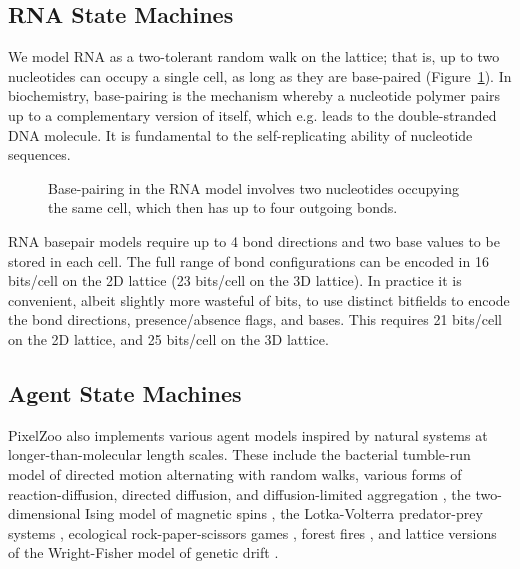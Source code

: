 \documentclass{acm_proc_article-sp}
\begin{document}
\subsection{RNA State Machines}

We model RNA as a two-tolerant random walk on the lattice\cite{LeoniVanderzande2003};
that is, up to two nucleotides can occupy a single cell, as long as they are base-paired
(Figure~\ref{fig:rna}).
In biochemistry, base-pairing is the mechanism whereby a nucleotide polymer pairs up to
a complementary version of itself, which e.g. leads to the double-stranded DNA molecule.
It is fundamental to the self-replicating ability of nucleotide sequences.

\begin{figure}
\caption{
\label{fig:rna}
Base-pairing in the RNA model involves two nucleotides occupying the same cell, which then has up to four outgoing bonds.
}
\end{figure}

RNA basepair models require up to 4 bond directions and two base values to be stored in each cell.
The full range of bond configurations can be encoded in 16 bits/cell on the 2D lattice (23 bits/cell on the 3D lattice).
In practice it is convenient, albeit slightly more wasteful of bits,
to use distinct bitfields to encode the bond directions, presence/absence flags, and bases.
This requires 21 bits/cell on the 2D lattice, and 25 bits/cell on the 3D lattice.


\subsection{Agent State Machines}
\label{sec:AgentStateMachines}

PixelZoo also implements various agent models inspired by natural systems at longer-than-molecular length scales.
These include the bacterial tumble-run model of directed motion alternating with random walks\cite{RosserEtAl2013},
various forms of reaction-diffusion, directed diffusion, and diffusion-limited aggregation \cite{DLA},
the two-dimensional Ising model of magnetic spins \cite{Onsager1944},
the Lotka-Volterra predator-prey systems \cite{Lotka1910,Hirota199739},
ecological rock-paper-scissors games \cite{Tainaka2000},
forest fires \cite{Karafyllidis1997},
and lattice versions of the Wright-Fisher model of genetic drift \cite{MathiesonMcVean2013}.
\end{document}
